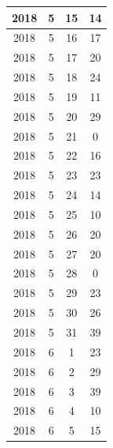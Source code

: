 \begin{longtable} {|c|c|c|c|}
\hline
2018         & 5            & 15           & 14                        \\ 
\hline
2018         & 5            & 16           & 17                        \\ 
\hline
2018         & 5            & 17           & 20                        \\ 
\hline
2018         & 5            & 18           & 24                        \\ 
\hline
2018         & 5            & 19           & 11                        \\ 
\hline
2018         & 5            & 20           & 29                        \\ 
\hline
2018         & 5            & 21           & 0                         \\ 
\hline
2018         & 5            & 22           & 16                        \\ 
\hline
2018         & 5            & 23           & 23                        \\ 
\hline
2018         & 5            & 24           & 14                        \\ 
\hline
2018         & 5            & 25           & 10                        \\ 
\hline
2018         & 5            & 26           & 20                        \\ 
\hline
2018         & 5            & 27           & 20                        \\ 
\hline
2018         & 5            & 28           & 0                         \\ 
\hline
2018         & 5            & 29           & 23                        \\ 
\hline
2018         & 5            & 30           & 26                        \\ 
\hline
2018         & 5            & 31           & 39                        \\ 
\hline
2018         & 6            & 1            & 23                        \\ 
\hline
2018         & 6            & 2            & 29                        \\ 
\hline
2018         & 6            & 3            & 39                        \\ 
\hline
2018         & 6            & 4            & 10                        \\ 
\hline
2018         & 6            & 5            & 15                        \\ 

\end{longtable}
